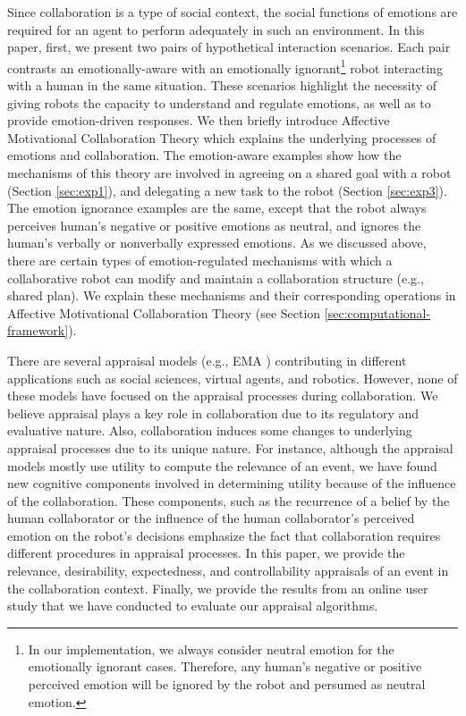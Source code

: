 Since collaboration is a type of social context, the social functions of
emotions are required for an agent to perform adequately in such an environment.
In this paper, first, we present two pairs of hypothetical interaction
scenarios. Each pair contrasts an emotionally-aware with an emotionally
ignorant\footnote{In our implementation, we always consider neutral emotion for
the emotionally ignorant cases. Therefore, any human's negative or positive
perceived emotion will be ignored by the robot and persumed as neutral emotion.}
robot interacting with a human in the same situation. These scenarios highlight
the necessity of giving robots the capacity to understand and regulate emotions,
as well as to provide emotion-driven responses. We then briefly introduce
Affective Motivational Collaboration Theory which explains the underlying
processes of emotions and collaboration. The emotion-aware examples show how the
mechanisms of this theory are involved in agreeing on a shared goal with a robot
(Section \ref{sec:exp1}), and delegating a new task to the robot (Section
\ref{sec:exp3}). The emotion ignorance examples are the same, except that the
robot always perceives human's negative or positive emotions as neutral, and
ignores the human's verbally or nonverbally expressed emotions. As we discussed
above, there are certain types of emotion-regulated mechanisms with which a
collaborative robot can modify and maintain a collaboration structure (e.g.,
shared plan). We explain these mechanisms and their corresponding operations in
Affective Motivational Collaboration Theory (see Section
\ref{sec:computational-framework}).

There are several appraisal models (e.g., EMA \cite{marsella:ema-process-model})
contributing in different applications such as social sciences, virtual agents,
and robotics. However, none of these models have focused on the appraisal
processes during collaboration. We believe appraisal plays a key role in
collaboration due to its regulatory and evaluative nature. Also, collaboration
induces some changes to underlying appraisal processes due to its unique nature.
For instance, although the appraisal models mostly use utility to compute the
relevance of an event, we have found new cognitive components involved in
determining utility because of the influence of the collaboration. These
components, such as the recurrence of a belief by the human collaborator or the
influence of the human collaborator's perceived emotion on the robot's decisions
emphasize the fact that collaboration requires different procedures in appraisal
processes. In this paper, we provide the relevance, desirability, expectedness,
and controllability appraisals of an event in the collaboration context.
Finally, we provide the results from an online user study that we have conducted
to evaluate our appraisal algorithms.

